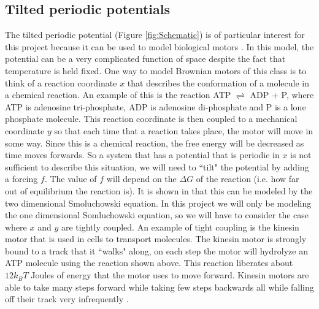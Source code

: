 \subsection{Tilted periodic potentials}
The tilted periodic potential (Figure \ref{fig:Schematic}) is of particular interest for this project because it can be used to model biological motors \cite{Leibler1993,Magnasco1994}. In this model, the potential can be a very complicated function of space despite the fact that temperature is held fixed. One way to model Brownian motors of this class is to think of a reaction coordinate $x$ that describes the conformation of a molecule in a chemical reaction. An example of this is the reaction ATP $\rightleftharpoons$ ADP + P, where ATP is adenosine tri-phosphate, ADP is adenosine di-phosphate and P is a lone phosphate molecule. This reaction coordinate is then coupled to a mechanical coordinate $y$ so that each time that a reaction takes place, the motor will move in some way. Since this is a chemical reaction, the free energy will be decreased as time moves forwards. So a system that has a potential that is periodic in $x$ is not sufficient to describe this situation, we will need to ``tilt" the potential by adding a forcing $f$. The value of $f$ will depend on the $\Delta G$ of the reaction (i.e. how far out of equilibrium the reaction is). It is shown in \cite{Magnasco1994} that this can be modeled by the two dimensional Smoluchowski equation. In this project we will only be modeling the one dimensional Somluchowski equation, so we will have to consider the case where $x$ and $y$ are tightly coupled. An example of tight coupling is the kinesin motor \cite{Leibler1993} that is used in cells to transport molecules. The kinesin motor is strongly bound to a track that it ``walks" along, on each step the motor will hydrolyze an ATP molecule using the reaction shown above. This reaction liberates about $12 k_B T$ Joules of energy that the motor uses to move forward. Kinesin motors are able to take many steps forward while taking few steps backwards all while falling off their track very infrequently \cite{BlockSM1990}.